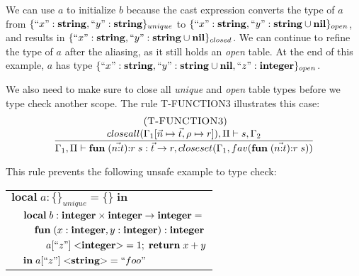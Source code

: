 We can use $a$ to initialize $b$ because the cast expression converts
the type of $a$ from $\{``x":\mathbf{string}, ``y":\mathbf{string}\}_{unique}$ to
$\{``x":\mathbf{string}, ``y":\mathbf{string} \cup \mathbf{nil}\}_{open}$, and results in
$\{``x":\mathbf{string}, ``y":\mathbf{string} \cup \mathbf{nil}\}_{closed}$.
We can continue to refine the type of $a$ after the aliasing,
as it still holds an \emph{open} table.
At the end of this example, $a$ has type
$\{``x":\mathbf{string}, ``y":\mathbf{string} \cup \mathbf{nil}, ``z":\mathbf{integer}\}_{open}$.

We also need to make sure to close all \emph{unique} and \emph{open}
table types before we type check another scope.
The rule \textsc{T-FUNCTION3} illustrates this case:
\[
\begin{array}{c}
\; (\textsc{T-FUNCTION3})\\
\dfrac{closeall(\Gamma_{1}[\vec{n} \mapsto \vec{t}, \rho \mapsto r]), \Pi \vdash s, \Gamma_{2}}
      {\Gamma_{1}, \Pi \vdash \mathbf{fun} \; (\vec{n{:}t}){:}r \; s:\vec{t} \rightarrow r, closeset(\Gamma_{1}, fav(\mathbf{fun} \; (\vec{n{:}t}){:}r \; s))}
\end{array}
\]

This rule prevents the following unsafe example to type check:
\begin{center}
\begin{tabular}{llll}
\multicolumn{4}{l}{$\mathbf{local} \; a:\{\}_{unique} = \{\} \; \mathbf{in}$}\\
& \multicolumn{3}{l}{$\mathbf{local} \; b:\mathbf{integer} \times \mathbf{integer} \rightarrow \mathbf{integer} =$}\\
& & \multicolumn{2}{l}{$\mathbf{fun} \; (x:\mathbf{integer}, y:\mathbf{integer}):\mathbf{integer}$}\\
& & & \multicolumn{1}{l}{$a[``z"] \; {<}\mathbf{integer}{>} = 1; \; \mathbf{return} \; x + y$}\\
& \multicolumn{3}{l}{$\mathbf{in} \; a[``z"] \; {<}\mathbf{string}{>} = ``foo"$}
\end{tabular}
\end{center}

